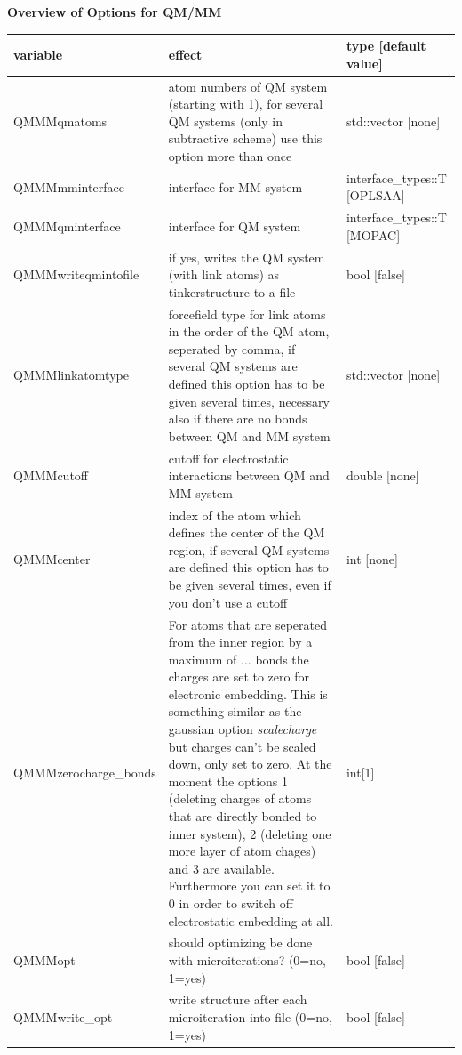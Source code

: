 \documentclass[10pt,a4paper]{article} %
\begin{document}
\textbf{Overview of Options for QM/MM\\}

		\begin{longtable}{|p{3.7cm}|p{5cm}|p{3cm}|}
		variable & effect & type [default value] \\
		\hline
			QMMMqmatoms  & atom numbers of QM system (starting with 1), for several QM systems (only in subtractive scheme) use this option more than once & std::vector [none]\\
			QMMMmminterface  & interface for MM system & interface\_types::T [OPLSAA]\\
			QMMMqminterface & interface for QM system & interface\_types::T [MOPAC]\\
			QMMMwriteqmintofile & if yes, writes the QM system (with link atoms) as tinkerstructure to a file  &  bool [false]\\
			QMMMlinkatomtype   & forcefield type for link atoms in the order of the QM atom, seperated by comma, if several QM systems are defined this option has to be given several times, necessary also if there are no bonds between QM and MM system & std::vector [none] \\
			QMMMcutoff & cutoff for electrostatic interactions between QM and MM system & double [none]\\
            QMMMcenter & index of the atom which defines the center of the QM region, if several QM systems are defined this option has to be given several times, even if you don't use a cutoff & int [none]\\
			QMMMzerocharge\_bonds   & For atoms that are seperated from the inner region by a maximum of ... bonds the charges are set to zero for electronic embedding. This is something similar as the gaussian option \textit{scalecharge} but charges can't be scaled down, only set to zero. At the moment the options 1 (deleting charges of atoms that are directly bonded to inner system), 2 (deleting one more layer of atom chages) and 3 are available. Furthermore you can set it to 0 in order to switch off electrostatic embedding at all. & int[1] \\
			QMMMopt & should optimizing be done with microiterations? (0=no, 1=yes) & bool [false]\\
			QMMMwrite\_opt & write structure after each microiteration into file (0=no, 1=yes) & bool [false]\\
		\end{longtable}~\\
	
\end{document}

